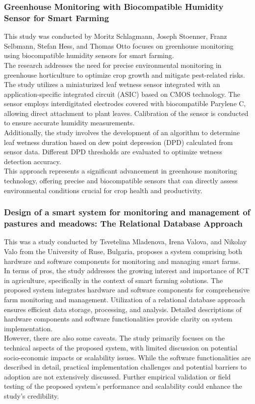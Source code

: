 \documentclass[12pt, a4paper]{article}
\begin{document}
\subsubsection{Greenhouse Monitoring with Biocompatible Humidity Sensor for Smart Farming}
This study was conducted by Moritz Schlagmann, Joseph Stoenner, Franz Selbmann, Stefan Hess, and Thomas Otto \cite{schlagmann2023greenhouse} focuses on greenhouse monitoring using biocompatible humidity sensors for smart farming.\\
The research addresses the need for precise environmental monitoring in greenhouse horticulture to optimize crop growth and mitigate pest-related risks.\\
The study utilizes a miniaturized leaf wetness sensor integrated with an application-specific integrated circuit (ASIC) based on CMOS technology. The sensor employs interdigitated electrodes covered with biocompatible Parylene C, allowing direct attachment to plant leaves. Calibration of the sensor is conducted to ensure accurate humidity measurements.\\
Additionally, the study involves the development of an algorithm to determine leaf wetness duration based on dew point depression (DPD) calculated from sensor data. Different DPD thresholds are evaluated to optimize wetness detection accuracy.\\
This approach represents a significant advancement in greenhouse monitoring technology, offering precise and biocompatible sensors that can directly assess environmental conditions crucial for crop health and productivity.
 
 \subsubsection{Design of a smart system for monitoring and management of pastures and meadows: The Relational Database Approach}
This was a study conducted by Tsvetelina Mladenova, Irena Valova, and Nikolay Valo \cite{mladenova2022design} from the University of Ruse, Bulgaria, proposes a system comprising both hardware and software components for monitoring and managing smart farms.\\
In terms of pros, the study addresses the growing interest and importance of ICT in agriculture, specifically in the context of smart farming solutions. The proposed system integrates hardware and software components for comprehensive farm monitoring and management. Utilization of a relational database approach ensures efficient data storage, processing, and analysis. Detailed descriptions of hardware components and software functionalities provide clarity on system implementation.\\
However, there are also some caveats. The study primarily focuses on the technical aspects of the proposed system, with limited discussion on potential socio-economic impacts or scalability issues. While the software functionalities are described in detail, practical implementation challenges and potential barriers to adoption are not extensively discussed. Further empirical validation or field testing of the proposed system's performance and scalability could enhance the study's credibility.
\end{document}
